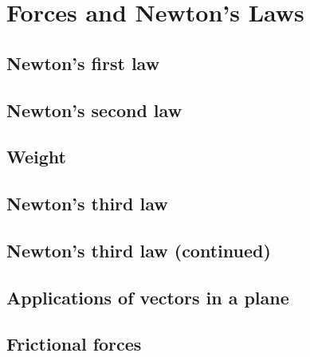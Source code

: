 
\chapter{Forces and Newton’s Laws}
\section{Newton’s first law}
\section{Newton’s second law}
\section{Weight}
\section{Newton’s third law}
\section{Newton’s third law (continued)}
\section{Applications of vectors in a plane}
\section{Frictional forces}